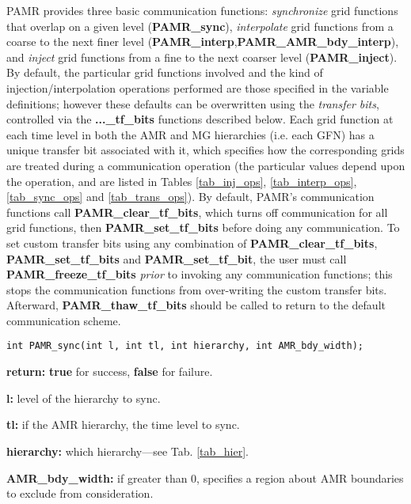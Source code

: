 \documentclass[aps,amssymb,unsortedaddress,nofootinbib]{revtex4}
\def\lsep{\itemsep 0.05in}
\begin{document}
PAMR provides three basic communication functions: {\em synchronize} grid functions
that overlap on a given level ({\bf PAMR\_sync}), {\em interpolate} 
grid functions from a coarse to the
next finer level ({\bf PAMR\_interp},{\bf PAMR\_AMR\_bdy\_interp}), 
and {\em inject} grid functions from a fine to the next coarser level ({\bf PAMR\_inject}).
By default, the particular grid functions involved and the kind of injection/interpolation 
operations performed are those specified in the variable definitions; however these
defaults can be overwritten using the {\em transfer bits}, controlled via the
{\bf...\_tf\_bits} functions described below. Each grid function at each time 
level in both the AMR and MG hierarchies (i.e. each GFN) has a unique transfer bit associated with
it, which specifies how the corresponding grids are treated during a communication
operation (the particular values depend upon the operation, and are listed in
Tables \ref{tab_inj_ops}, \ref{tab_interp_ops}, \ref{tab_sync_ops} and \ref{tab_trans_ops}).
By default, PAMR's communication functions call {\bf PAMR\_clear\_tf\_bits}, which turns off
communication for all grid functions, then {\bf PAMR\_set\_tf\_bits} before doing any 
communication. To set custom transfer bits using any combination of
{\bf PAMR\_clear\_tf\_bits}, {\bf PAMR\_set\_tf\_bits} and {\bf PAMR\_set\_tf\_bit},
the user must call {\bf PAMR\_freeze\_tf\_bits} {\em prior} to invoking any communication
functions; this stops the communication functions from over-writing the custom transfer bits.
Afterward, {\bf PAMR\_thaw\_tf\_bits} should be called
to return to the default communication scheme.


\begin{verbatim}
int PAMR_sync(int l, int tl, int hierarchy, int AMR_bdy_width);
\end{verbatim}
\begin{list}{}{\lsep}
\item {\bf return:} {\bf true} for success, {\bf false} for failure.
\item {\bf l:} level of the hierarchy to sync.
\item {\bf tl:} if the AMR hierarchy, the time level to sync.
\item {\bf hierarchy:} which hierarchy---see Tab. \ref{tab_hier}.
\item {\bf AMR\_bdy\_width:} if greater than 0, specifies a region about 
                             AMR boundaries to exclude from consideration.
\end{list}
\end{document}
